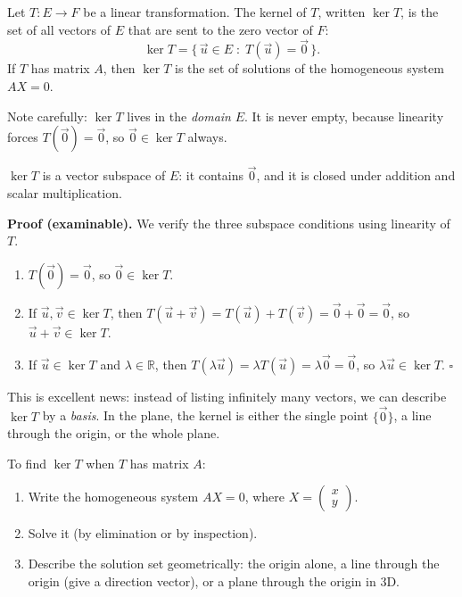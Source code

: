 \documentclass[11pt]{article}
\newcommand{\cle}[1]{{\popxbold\color{popdark}#1}}
\begin{document}
\begin{definition}
Let $T : E \to F$ be a linear transformation. The \cle{kernel} of $T$, written $\ker T$, is the set of all vectors of $E$ that are sent to the zero vector of $F$:
\[ \ker T = \{\, \vec{u} \in E \;:\; T(\vec{u}) = \vec{0} \,\}. \]
If $T$ has matrix $A$, then $\ker T$ is the set of solutions of the homogeneous system $AX = 0$.
\end{definition}

Note carefully: $\ker T$ lives in the \emph{domain} $E$. It is never empty, because linearity forces $T(\vec{0}) = \vec{0}$, so $\vec{0} \in \ker T$ always.

\begin{propriete}
$\ker T$ is a vector subspace of $E$: it contains $\vec{0}$, and it is closed under addition and scalar multiplication.
\end{propriete}

\textbf{Proof (examinable).} We verify the three subspace conditions using linearity of $T$.
\begin{enumerate}
\item $T(\vec{0}) = \vec{0}$, so $\vec{0} \in \ker T$.
\item If $\vec{u}, \vec{v} \in \ker T$, then $T(\vec{u} + \vec{v}) = T(\vec{u}) + T(\vec{v}) = \vec{0} + \vec{0} = \vec{0}$, so $\vec{u} + \vec{v} \in \ker T$.
\item If $\vec{u} \in \ker T$ and $\lambda \in \mathbb{R}$, then $T(\lambda \vec{u}) = \lambda T(\vec{u}) = \lambda \vec{0} = \vec{0}$, so $\lambda \vec{u} \in \ker T$. \hfill$\square$
\end{enumerate}

This is excellent news: instead of listing infinitely many vectors, we can describe $\ker T$ by a \emph{basis}. In the plane, the kernel is either the single point $\{\vec{0}\}$, a line through the origin, or the whole plane.

\begin{methode}
To find $\ker T$ when $T$ has matrix $A$:
\begin{enumerate}
\item Write the homogeneous system $AX = 0$, where $X = \begin{pmatrix} x \\ y \end{pmatrix}$.
\item Solve it (by elimination or by inspection).
\item Describe the solution set geometrically: the origin alone, a line through the origin (give a direction vector), or a plane through the origin in 3D.
\end{enumerate}
\end{methode}
\end{document}
